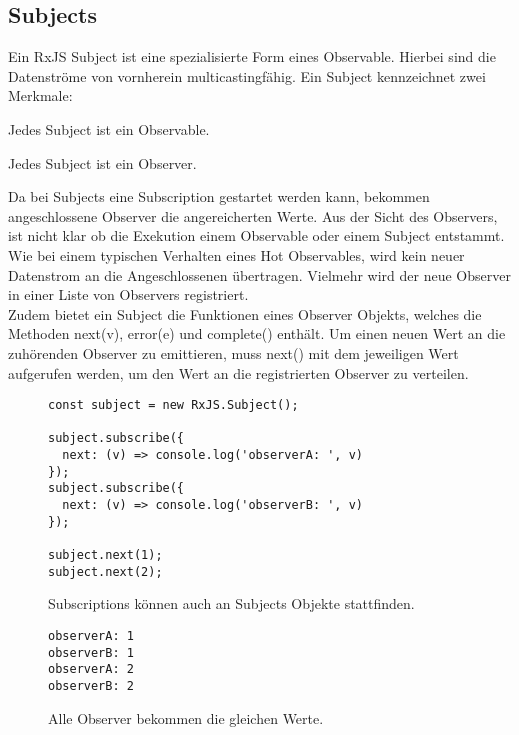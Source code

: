 \subsection{Subjects}

Ein RxJS Subject ist eine spezialisierte Form eines Observable. Hierbei sind die Datenströme von vornherein multicastingfähig. Ein Subject kennzeichnet zwei Merkmale:

\begin{description}
\item Jedes Subject ist ein Observable.
\item Jedes Subject ist ein Observer.
\end{description}

\noindent
Da bei Subjects eine Subscription gestartet werden kann, bekommen angeschlossene Observer die angereicherten Werte. Aus der Sicht des Observers, ist nicht klar ob die Exekution einem Observable oder einem Subject entstammt. Wie bei einem typischen Verhalten eines Hot Observables, wird kein neuer Datenstrom an die Angeschlossenen übertragen. Vielmehr wird der neue Observer in einer Liste von Observers registriert.\\

\noindent
Zudem bietet ein Subject die Funktionen eines Observer Objekts, welches die Methoden next(v), error(e) und complete() enthält. Um einen neuen Wert an die zuhörenden Observer zu emittieren, muss next() mit dem jeweiligen Wert aufgerufen werden, um den Wert an die registrierten Observer zu verteilen.

\begin{figure}[H]
\begin{lstlisting}[basicstyle=\small]
const subject = new RxJS.Subject();

subject.subscribe({
  next: (v) => console.log('observerA: ', v)
});
subject.subscribe({
  next: (v) => console.log('observerB: ', v)
});

subject.next(1);
subject.next(2);
\end{lstlisting}
\caption{Subscriptions können auch an Subjects Objekte stattfinden.}
\end{figure}

\begin{figure}[H]
\begin{lstlisting}
observerA: 1
observerB: 1
observerA: 2
observerB: 2
\end{lstlisting}
\caption{Alle Observer bekommen die gleichen Werte.}
\end{figure}


